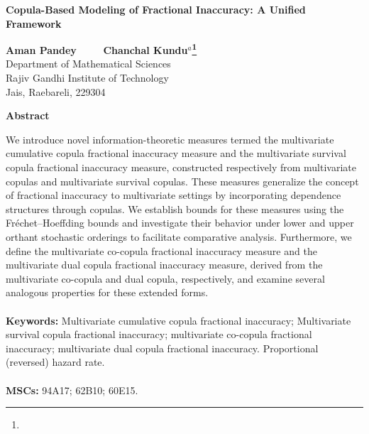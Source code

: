 \documentclass[12pt, a4paper]{article}
\numberwithin{equation}{section}
\begin{document}
	\newcommand{\bea}{\begin{eqnarray}}
		\newcommand{\eea}{\end{eqnarray}}
	\newcommand{\nn}{\nonumber}
	\newcommand{\bee}{\begin{eqnarray*}}
		\newcommand{\eee}{\end{eqnarray*}}
	\newcommand{\lb}{\label}
	\newcommand{\nii}{\noindent}
	\newcommand{\ii}{\indent}
	\newtheorem{theorem}{Theorem}[section]
	\newtheorem{example}{Example}[section]
	\renewcommand{\qedsymbol}{\rule{0.7em}{0.7em}}
	\renewcommand{\theequation}{\thesection.\arabic{equation}}
	\begin{center}
	{\Large\bf Copula-Based Modeling of Fractional Inaccuracy: A Unified Framework} \\
	\vspace{0.3in}
	
	{\bf Aman Pandey~~~~ \bf Chanchal Kundu$^{a}$\footnote{}}
	\\
	Department of Mathematical Sciences\\ Rajiv Gandhi Institute of Technology\\Jais, Raebareli, 229304\\
\end{center}
\date{}

		\begin{center}
\textbf{Abstract}
		\end{center} 
We introduce novel information-theoretic measures termed the multivariate cumulative copula fractional inaccuracy measure and the multivariate survival copula fractional inaccuracy measure, constructed respectively from multivariate copulas and multivariate survival copulas. These measures generalize the concept of fractional inaccuracy to multivariate settings by incorporating dependence structures through copulas. We establish bounds for these measures using the Fréchet–Hoeffding bounds and investigate their behavior under lower and upper orthant stochastic orderings to facilitate comparative analysis. Furthermore, we define the multivariate co-copula fractional inaccuracy measure and the multivariate dual copula fractional inaccuracy measure, derived from the multivariate co-copula and dual copula, respectively, and examine several analogous properties for these extended forms.
		\\\\		
\textbf{Keywords:} Multivariate cumulative copula  fractional inaccuracy; Multivariate survival copula fractional inaccuracy; multivariate  co-copula fractional inaccuracy; multivariate dual copula  fractional inaccuracy. Proportional (reversed) hazard rate. \\
		 \\
\textbf{MSCs:} 94A17; 62B10; 60E15.
\end{document}
